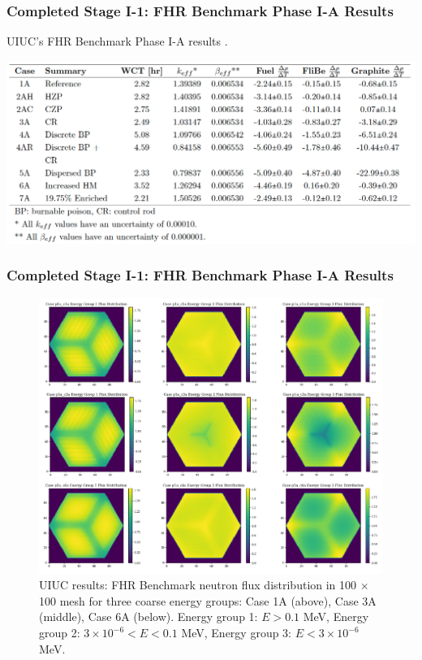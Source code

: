 \begin{frame}
    \frametitle{Completed Stage I-1: FHR Benchmark Phase I-A Results}
    \begin{table}
        \caption{\acrlong{UIUC}'s \acrlong{FHR} Benchmark Phase I-A results 
        \cite{chee_arfcfhr-benchmark_2021}.}
        \includegraphics[width=\linewidth]{figures/benchmark-coeff-results.png} 
    \end{table}
\end{frame}

\begin{frame}
    \frametitle{Completed Stage I-1: FHR Benchmark Phase I-A Results}
    \begin{figure}[]
        \centering
        \includegraphics[width=0.6\linewidth]{figures/phase1a-e.png} 
        \caption{UIUC results: FHR Benchmark neutron flux 
        distribution in 100 $\times$ 100 mesh for three coarse energy groups: Case 
        1A (above), Case 3A (middle), Case 6A (below). Energy group 1: $E > 0.1$ MeV, 
        Energy group 2: $3 \times 10^{-6} < E < 0.1$ MeV, Energy group 3: $E < 3 \times 10^{-6}$ MeV. }
    \end{figure}
\end{frame}